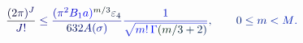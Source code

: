 \documentclass[12pt]{article}
\begin{document}
\makeatletter
\renewcommand*{\@textcolor}[3]{%
  \protect\leavevmode
  \begingroup
    \color#1{#2}#3%
  \endgroup
}
\makeatother
\begin{displaymath}
\mathcolor[RGB]{0,0,15}{\frac { \mathcolor[RGB]{0,0,30}{(} \mathcolor[RGB]{0,0,45}{2} \mathcolor[RGB]{0,0,60}{\pi} \mathcolor[RGB]{0,0,75}{)} ^ { \mathcolor[RGB]{0,0,90}{J} } } { \mathcolor[RGB]{0,0,105}{J} \mathcolor[RGB]{0,0,120}{!} } } \mathcolor[RGB]{0,0,135}{\leq} \mathcolor[RGB]{0,0,150}{\frac { \mathcolor[RGB]{0,0,165}{(} \mathcolor[RGB]{0,0,180}{\pi} ^ { \mathcolor[RGB]{0,0,195}{2} } \mathcolor[RGB]{0,0,210}{B} _ { \mathcolor[RGB]{0,0,225}{1} } \mathcolor[RGB]{0,0,240}{a} \mathcolor[RGB]{0,0,255}{)} ^ { \mathcolor[RGB]{0,15,0}{m} \mathcolor[RGB]{0,15,15}{/} \mathcolor[RGB]{0,15,30}{3} } \mathcolor[RGB]{0,15,45}{\varepsilon} _ { \mathcolor[RGB]{0,15,60}{4} } } { \mathcolor[RGB]{0,15,75}{6} \mathcolor[RGB]{0,15,90}{3} \mathcolor[RGB]{0,15,105}{2} \mathcolor[RGB]{0,15,120}{A} \mathcolor[RGB]{0,15,135}{(} \mathcolor[RGB]{0,15,150}{\sigma} \mathcolor[RGB]{0,15,165}{)} } } \mathcolor[RGB]{0,15,180}{\frac { \mathcolor[RGB]{0,15,195}{1} } { \mathcolor[RGB]{0,15,210}{\sqrt { \mathcolor[RGB]{0,15,225}{m} \mathcolor[RGB]{0,15,240}{!} \, \mathcolor[RGB]{0,15,255}{\Gamma} \mathcolor[RGB]{0,30,0}{(} \mathcolor[RGB]{0,30,15}{m} \mathcolor[RGB]{0,30,30}{/} \mathcolor[RGB]{0,30,45}{3} \mathcolor[RGB]{0,30,60}{+} \mathcolor[RGB]{0,30,75}{2} \mathcolor[RGB]{0,30,90}{)} } } } } \mathcolor[RGB]{0,30,105}{,} \qquad \mathcolor[RGB]{0,30,120}{0} \mathcolor[RGB]{0,30,135}{\leq} \mathcolor[RGB]{0,30,150}{m} \mathcolor[RGB]{0,30,165}{<} \mathcolor[RGB]{0,30,180}{M} \mathcolor[RGB]{0,30,195}{.}
\end{displaymath}
\end{document}

